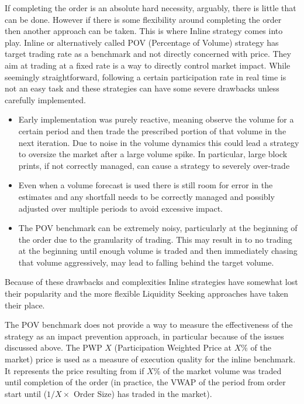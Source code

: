 If completing the order is an absolute hard necessity, arguably, there is little that can be done. However if there is some flexibility around completing the order then another approach can be taken. This is where Inline strategy comes into play. Inline or alternatively called POV (Percentage of Volume) strategy has target trading rate as a benchmark and not directly concerned with price. They aim at trading at a fixed rate is a way to directly control market impact. While seemingly straightforward, following a certain participation rate in real time is not an easy task and these strategies can have some severe drawbacks unless carefully implemented.


\begin{itemize}
\item Early implementation was purely reactive, meaning observe the volume for a certain period and then trade the prescribed portion of that volume in the next iteration. Due to noise in the volume dynamics this could lead a strategy to oversize the market after a large volume spike. In particular, large block prints, if not correctly managed, can cause a strategy to severely over-trade

\item Even when a volume forecast is used there is still room for error in the estimates and any shortfall needs to be correctly managed and possibly adjusted over multiple periods to avoid excessive impact.

\item The POV benchmark can be extremely noisy, particularly at the beginning of the order due to the granularity of trading. This may result in to no trading at the beginning until enough volume is traded and then immediately chasing that volume aggressively, may lead to falling behind the target volume.
\end{itemize}


Because of these drawbacks and complexities Inline strategies have somewhat lost their popularity and the more flexible Liquidity Seeking approaches  have taken their place.


The POV benchmark does not provide a way to measure the effectiveness of the strategy as an impact prevention approach, in particular because of the issues discussed above. The PWP $X$ (Participation Weighted Price at $X$\% of the market) price is used as a measure of execution quality for the inline benchmark. It represents the price resulting from if $X$\% of the market volume was traded until completion of the order (in practice, the VWAP of the period from order start until ($1/X \times$ Order Size) has traded in the market). \twomedskip

